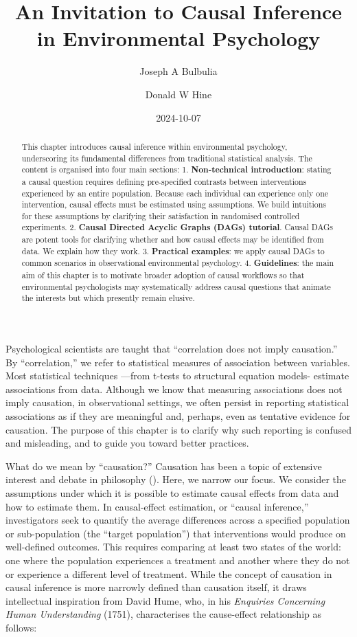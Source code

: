 \documentclass[
  singlecolumn]{article}
\title{An Invitation to Causal Inference in Environmental Psychology}
\author{Joseph A Bulbulia}
\affil{%
             \small{     Victoria University of Wellington, New Zealand,
School of Psychology, Centre for Applied Cross-Cultural Research
          ORCID \textcolor[HTML]{A6CE39}{\aiOrcid} ~0000-0002-5861-2056 }
              }
\author{Donald W Hine}
\affil{%
             \small{     University of Canterbury, School of Psychology,
Speech and Hearing
          ORCID \textcolor[HTML]{A6CE39}{\aiOrcid} ~0000-0002-3905-7026 }
              }
\date{2024-10-07}
\begin{document}
\maketitle
\begin{abstract}
This chapter introduces causal inference within environmental
psychology, underscoring its fundamental differences from traditional
statistical analysis. The content is organised into four main sections:
1. \textbf{Non-technical introduction}: stating a causal question
requires defining pre-specified contrasts between interventions
experienced by an entire population. Because each individual can
experience only one intervention, causal effects must be estimated using
assumptions. We build intuitions for these assumptions by clarifying
their satisfaction in randomised controlled experiments. 2.
\textbf{Causal Directed Acyclic Graphs (DAGs) tutorial}. Causal DAGs are
potent tools for clarifying whether and how causal effects may be
identified from data. We explain how they work. 3. \textbf{Practical
examples}: we apply causal DAGs to common scenarios in observational
environmental psychology. 4. \textbf{Guidelines}: the main aim of this
chapter is to motivate broader adoption of causal workflows so that
environmental psychologists may systematically address causal questions
that animate the interests but which presently remain elusive.
\end{abstract}

Psychological scientists are taught that ``correlation does not imply
causation.'' By ``correlation,'' we refer to statistical measures of
association between variables. Most statistical techniques ---from
t-tests to structural equation models- estimate associations from data.
Although we know that measuring associations does not imply causation,
in observational settings, we often persist in reporting statistical
associations as if they are meaningful and, perhaps, even as tentative
evidence for causation. The purpose of this chapter is to clarify why
such reporting is confused and misleading, and to guide you toward
better practices.

What do we mean by ``causation?'' Causation has been a topic of
extensive interest and debate in philosophy
(). Here, we narrow our focus. We
consider the assumptions under which it is possible to estimate causal
effects from data and how to estimate them. In causal-effect estimation,
or ``causal inference,'' investigators seek to quantify the average
differences across a specified population or sub-population (the
``target population'') that interventions would produce on well-defined
outcomes. This requires comparing at least two states of the world: one
where the population experiences a treatment and another where they do
not or experience a different level of treatment. While the concept of
causation in causal inference is more narrowly defined than causation
itself, it draws intellectual inspiration from David Hume, who, in his
\emph{Enquiries Concerning Human Understanding} (1751), characterises
the cause-effect relationship as follows:
\end{document}
